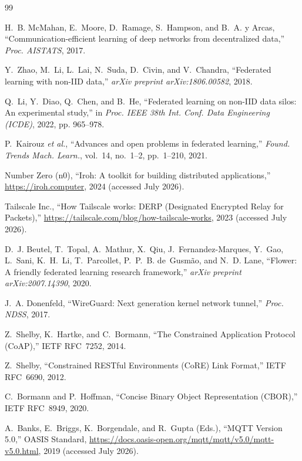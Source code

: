 \documentclass[a4paper,fleqn]{cas-dc}
\begin{document}
\begin{thebibliography}{99}

H.~B. McMahan, E.~Moore, D.~Ramage, S.~Hampson, and B.~A. y Arcas,
``Communication-efficient learning of deep networks from decentralized data,''
\emph{Proc. AISTATS}, 2017.

Y.~Zhao, M.~Li, L.~Lai, N.~Suda, D.~Civin, and V.~Chandra,
``Federated learning with non-IID data,''
\emph{arXiv preprint arXiv:1806.00582}, 2018.

Q.~Li, Y.~Diao, Q.~Chen, and B.~He,
``Federated learning on non-IID data silos: An experimental study,''
in \emph{Proc. IEEE 38th Int. Conf. Data Engineering (ICDE)}, 2022, pp. 965--978.

P.~Kairouz \emph{et al.},
``Advances and open problems in federated learning,''
\emph{Found. Trends Mach. Learn.}, vol.~14, no.~1--2, pp.~1--210, 2021.

Number Zero (n0),
``Iroh: A toolkit for building distributed applications,''
\url{https://iroh.computer}, 2024 (accessed July 2026).

Tailscale Inc.,
``How Tailscale works: DERP (Designated Encrypted Relay for Packets),''
\url{https://tailscale.com/blog/how-tailscale-works}, 2023 (accessed July 2026).

D.~J. Beutel, T.~Topal, A.~Mathur, X.~Qiu, J.~Fernandez-Marques, Y.~Gao, L.~Sani, K.~H.~Li, T.~Parcollet, P.~P.~B. de~Gusm\~ao, and N.~D. Lane,
``Flower: A friendly federated learning research framework,''
\emph{arXiv preprint arXiv:2007.14390}, 2020.

J.~A. Donenfeld,
``WireGuard: Next generation kernel network tunnel,''
\emph{Proc. NDSS}, 2017.

Z.~Shelby, K.~Hartke, and C.~Bormann,
``The Constrained Application Protocol (CoAP),''
IETF RFC~7252, 2014.

Z.~Shelby,
``Constrained RESTful Environments (CoRE) Link Format,''
IETF RFC~6690, 2012.

C.~Bormann and P.~Hoffman,
``Concise Binary Object Representation (CBOR),''
IETF RFC~8949, 2020.

A.~Banks, E.~Briggs, K.~Borgendale, and R.~Gupta (Eds.),
``MQTT Version 5.0,''
OASIS Standard, \url{https://docs.oasis-open.org/mqtt/mqtt/v5.0/mqtt-v5.0.html}, 2019 (accessed July 2026).


\end{thebibliography}
\end{document}
